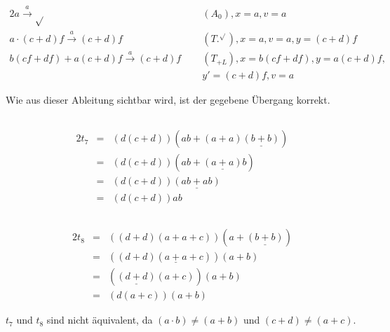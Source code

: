 \documentclass[10pt,a4paper,oneside,ngerman,numbers=noenddot]{scrartcl}
\begin{document}
\section{} %
    \subsection{}
    \begin{alignat*}{2}
        a \overset{a}{\rightarrow} \sqrt{} \;&&\; (A_0), x = a, v = a \\
        a \cdot (c + d)f \overset{a}{\rightarrow} (c + d)f \;&&\; (T.^{\sqrt{}}), x = a, v = a, y = (c + d)f \\
        b(cf + df) + a(c + d)f \overset{a}{\rightarrow} (c + d)f \;&&\; (T_{+L}), x = b(cf + df), y = a(c + d)f, \\
        &&\; y' = (c + d)f, v = a
    \end{alignat*}

    Wie aus dieser Ableitung sichtbar wird, ist der gegebene Übergang korrekt.

    \subsection{} %
        \begin{alignat*}{2}
            t_7 &=& (d(c + d))(ab + (a + a)\underline{(b + b)}) \\
            &=& (d(c + d))(ab + \underline{(a + a)}b) \\
            &=& (d(c + d))\underline{(ab + ab)} \\
            &=& (d(c + d))ab
        \end{alignat*}

    \subsection{}
        \begin{alignat*}{2}
            t_8 &=& ((d + d)(a + a + c))(a + \underline{(b + b)}) \\
            &=& ((d + d)(\underline{a + a} + c))(a + b) \\
            &=& (\underline{(d + d)}(a + c))(a + b) \\
            &=& (d(a + c))(a + b)
        \end{alignat*}

        \(t_7\) und \(t_8\) sind nicht äquivalent, da \((a \cdot b) \neq (a + b)\) und \((c + d) \neq (a + c)\).
\end{document}
